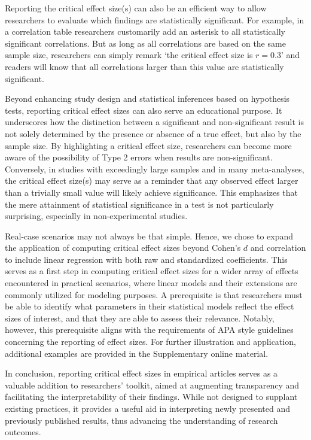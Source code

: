 \documentclass[
  man]{apa7}
\begin{document}
Reporting the critical effect size(s) can also be an efficient way to allow researchers to evaluate which findings are statistically significant. For example, in a correlation table researchers customarily add an asterisk to all statistically significant correlations. But as long as all correlations are based on the same sample size, researchers can simply remark `the critical effect size is \(r = 0.3\)' and readers will know that all correlations larger than this value are statistically significant.

Beyond enhancing study design and statistical inferences based on hypothesis tests, reporting critical effect sizes can also serve an educational purpose. It underscores how the distinction between a significant and non-significant result is not solely determined by the presence or absence of a true effect, but also by the sample size. By highlighting a critical effect size, researchers can become more aware of the possibility of Type 2 errors when results are non-significant. Conversely, in studies with exceedingly large samples and in many meta-analyses, the critical effect size(s) may serve as a reminder that any observed effect larger than a trivially small value will likely achieve significance. This emphasizes that the mere attainment of statistical significance in a test is not particularly surprising, especially in non-experimental studies.

Real-case scenarios may not always be that simple. Hence, we chose to expand the application of computing critical effect sizes beyond Cohen's \(d\) and correlation to include linear regression with both raw and standardized coefficients. This serves as a first step in computing critical effect sizes for a wider array of effects encountered in practical scenarios, where linear models and their extensions are commonly utilized for modeling purposes. A prerequisite is that researchers must be able to identify what parameters in their statistical models reflect the effect sizes of interest, and that they are able to assess their relevance. Notably, however, this prerequisite aligns with the requirements of APA style guidelines concerning the reporting of effect sizes. For further illustration and application, additional examples are provided in the Supplementary online material.

In conclusion, reporting critical effect sizes in empirical articles serves as a valuable addition to researchers' toolkit, aimed at augmenting transparency and facilitating the interpretability of their findings. While not designed to supplant existing practices, it provides a useful aid in interpreting newly presented and previously published results, thus advancing the understanding of research outcomes.
\end{document}
